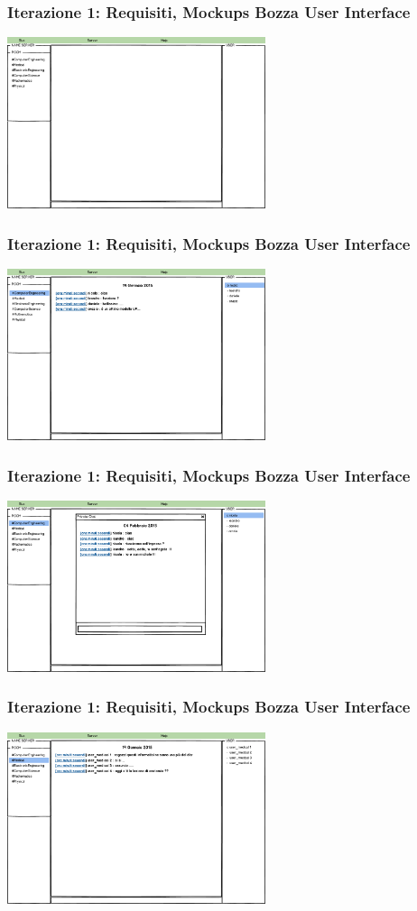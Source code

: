 \documentclass[t]{beamer} %
\begin{document}
\begin{frame}
 \frametitle{Iterazione 1: Requisiti, Mockups Bozza User Interface}
    \includegraphics[height=190px, width=286px,]{image_mockups/06_siuc_connect.png}{\centering}
\end{frame}

\begin{frame}
 \frametitle{Iterazione 1: Requisiti, Mockups Bozza User Interface}
    \includegraphics[height=190px, width=286px,]{image_mockups/07_siuc_user_room_ce.png}{\centering}
\end{frame}

\begin{frame}
 \frametitle{Iterazione 1: Requisiti, Mockups Bozza User Interface}
    \includegraphics[height=190px, width=286px,]{image_mockups/08_siuc_user_room_ce_private.png}{\centering}
\end{frame}

\begin{frame}
 \frametitle{Iterazione 1: Requisiti, Mockups Bozza User Interface}
    \includegraphics[height=190px, width=286px,]{image_mockups/09_siuc_user_room_medical.png}{\centering}
\end{frame}
\end{document}

